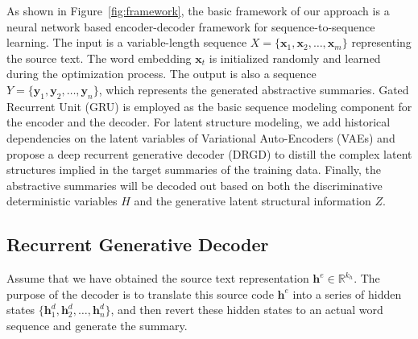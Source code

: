 \documentclass[11pt,letterpaper]{article}
\begin{document}
As shown in Figure~\ref{fig:framework}, the basic framework of our approach is a neural network based encoder-decoder framework for sequence-to-sequence learning.
The input is a variable-length sequence ${X} = \{\mathbf{x}_1, \mathbf{x}_2, \ldots, \mathbf{x}_m\}$ representing the source text.
The word embedding $\mathbf{x}_t$ is initialized randomly and learned during the optimization process. 
The output is also a sequence ${Y} = \{\mathbf{y}_1, \mathbf{y}_2, \ldots, \mathbf{y}_n\}$, which represents the generated abstractive summaries.
Gated Recurrent Unit (GRU) \cite{cho2014learning} is employed as the basic sequence modeling component for the encoder and the decoder.
For latent structure modeling, 
we add historical dependencies on the latent variables of Variational Auto-Encoders (VAEs) and propose a deep recurrent generative decoder (DRGD) to distill the complex latent structures implied in the target summaries of the training data. 
Finally, the abstractive summaries will be decoded out based on both the discriminative deterministic variables ${H}$ and the generative latent structural information ${Z}$.


\subsection{Recurrent Generative Decoder}

Assume that we have obtained the source text representation $\mathbf{h}^e \in \mathbb{R}^{k_h}$.
The purpose of the decoder is to translate this source code $\mathbf{h}^e$ into a series of hidden states $\{\mathbf{h}^d_1, \mathbf{h}^d_2, \ldots, \mathbf{h}^d_n \}$, and then revert these hidden states to an actual word sequence and generate the summary.
\end{document}
